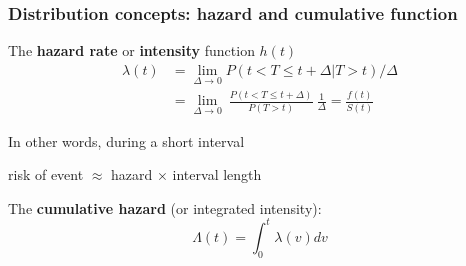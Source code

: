 \documentclass[handout,12pt]{beamer}
\begin{document}
\begin{frame}

\frametitle{Distribution concepts: hazard and cumulative function}

The \textbf{hazard rate} or \textbf{intensity} function $h(t)$
\begin{align*}
\lambda(t) & = \underset{\Delta \rightarrow 0}{\lim} 
 {P(t < T \le t+\Delta | T > t)}/{\Delta} \\
   & = \underset{\Delta \rightarrow 0}{\lim}\:
      \frac{P(t < T \le t+\Delta)}{P(T > t)}\: \frac{1}{\Delta}
     = \frac{f(t)}{S(t)}  
\end{align*}


In other words, during a short interval
 \begin{center}
 risk of event $\approx$ hazard $\times$ interval length 
 \end{center}

The \textbf{cumulative hazard} (or integrated intensity):
\[
\Lambda(t) = \int_0^t \lambda(v)dv
\]

\end{frame}

%

%
%
%
%
\end{document}
